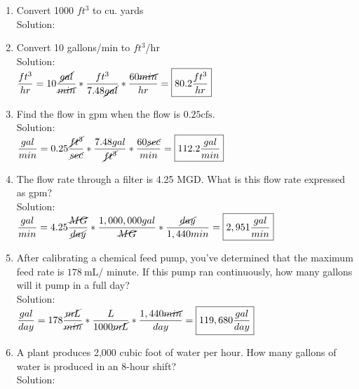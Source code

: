 \documentclass{article}
\begin{document}
\begin{enumerate}
\item Convert 1000 $ft^3$ to cu. yards\\
Solution:\\
\vspace{0.2cm}




\vspace{0.2cm}
\item Convert 10 gallons/min to $ft^3$/hr\\
Solution:\\
\vspace{0.2cm}
$\dfrac{ft^3}{hr}=10\dfrac{\cancel{gal}}{\cancel{min}}*\dfrac{ft^3}{7.48\cancel{gal}}*\dfrac{60\cancel{min}}{hr}=\boxed{80.2 \dfrac{ft^3}{hr}}$

\vspace{0.2cm}
\item Find the flow in gpm when the flow is $0.25 \mathrm{cfs}$.\\
Solution:\\
\vspace{0.2cm}
$\dfrac{gal}{min}=0.25\dfrac{\cancel{ft^3}}{\cancel{sec}}*\dfrac{7.48gal}{\cancel{ft^3}}*\dfrac{60\cancel{sec}}{min}=\boxed{112.2 \dfrac{gal}{min}}$


\vspace{0.2cm}
\item The flow rate through a filter is 4.25 MGD. What is this flow rate expressed as gpm?\\
Solution:\\
\vspace{0.2cm}
$\dfrac{gal}{min}=4.25\dfrac{\cancel{MG}}{\cancel{day}}*\dfrac{1,000,000gal}{\cancel{MG}}*\dfrac{\cancel{day}}{1,440min}=\boxed{2,951 \dfrac{gal}{min}}$

\vspace{0.2cm}
\item After calibrating a chemical feed pump, you've determined that the maximum feed rate is $178 \mathrm{~mL} /$ minute. If this pump ran continuously, how many gallons will it pump in a full day?\\
Solution:\\
\vspace{0.2cm}
$\dfrac{gal}{day}=178\dfrac{\cancel{mL}}{\cancel{min}}*\dfrac{L}{1000\cancel{mL}}*\dfrac{1,440\cancel{min}}{day}=\boxed{119,680 \dfrac{gal}{day}}$


\vspace{0.2cm}
\item A plant produces 2,000 cubic foot of water per hour. How many gallons of water is produced in an 8-hour shift?\\
Solution:\\
\vspace{0.2cm}


\end{enumerate}
\end{document}
